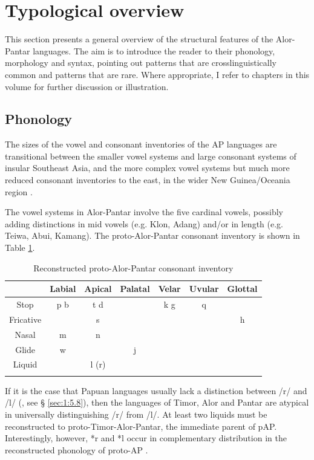 \section{Typological overview}\label{sec:1:5}

This section presents a general overview of the structural features of the Alor-Pantar languages. The aim is to introduce the reader to their phonology, morphology and syntax, pointing out patterns that are crosslinguistically common and patterns that are rare. Where appropriate, I refer to chapters in this volume for further discussion or illustration. 

\subsection{Phonology}\label{sec:1:5.1}
The sizes of the vowel and consonant inventories of the AP languages are transitional between the smaller vowel systems and large consonant systems of insular Southeast Asia, and the more complex vowel systems but much more reduced consonant inventories to the east, in the wider New Guinea/Oceania region \citep[cf.][]{Hajek2010}.

The vowel systems in Alor-Pantar involve the five cardinal vowels, possibly adding distinctions in mid vowels (e.g. Klon, Adang) and/or in length (e.g. Teiwa, Abui, Kamang). The proto-Alor-Pantar consonant inventory \citep{HoltonEtAl2012,HoltonRobinsonTVhistory} is shown in Table \ref{tab:1:3}.



\begin{table}\centering 
\begin{tabular}{ccccccc} 
\mytoprule
& {Labial} & {Apical} & {Palatal} & {Velar} & {Uvular} & {Glottal}\\
\midrule 
{Stop} & {p  b} & {t  d} &  & {k  g} & {q} & \\
{Fricative} &  & {s} &  &  &  & {h}\\
{Nasal} & {m} & {n} &  &  &  & \\
{Glide} & {w} &  & {j} &  &  & \\
{Liquid} &  & {l (r)} &  &  &  & \\
\mybottomrule
\end{tabular}
\caption{Reconstructed proto-Alor-Pantar consonant inventory}
\label{tab:1:3}
\end{table}

If it is the case that Papuan languages usually lack a distinction between /r/ and /l/ (\citealt{Foley1986}, see {\S} \ref{sec:1:5.8}), then the languages of Timor, Alor and Pantar are atypical in universally distinguishing /r/ from /l/. At least two liquids must be reconstructed to proto-Timor-Alor-Pantar, the immediate parent of pAP. Interestingly, however, *r and *l occur in complementary distribution in the reconstructed phonology of proto-AP \citep{HoltonEtAl2012}. 

